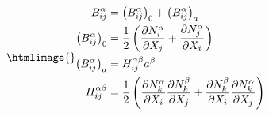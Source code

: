 \documentclass[a4paper,twoside]{article}
\renewcommand{\d}{\partial}\providecommand{\bm}[1]{\mathbf{#1}}
\begin{document}
\begin{flushright}
\begin{subequations}\htmlimage{}
\label{bgdefs}
\begin{align} B_{ij}^\alpha     & =
        \left(B_{ij}^\alpha\right)_0 + \left(B_{ij}^\alpha\right)_a \label{bdef}  \\
  \left(B_{ij}^\alpha\right)_0  & = \frac{1}{2}\left(\frac{\d N_i^\alpha}{\d X_j}
        + \frac{\d N_j^\alpha} {\d X_i} \right)                     \label{b0def} \\
  \left(B_{ij}^\alpha\right)_a  & = H_{ij}^{\alpha \beta} a^\beta   \label{budef} \\
  H_{ij}^{\alpha \beta}         & = 
    \frac{1}{2}\left( \frac{\d N_k^\alpha}{\d X_i} \frac{\d N_k^\beta}{\d X_j} 
    + \frac{\d N_k^\beta}{\d X_i} \frac{\d N_k^\alpha}{\d X_j} \right)  \label{gdef}
\end{align}
\end{subequations}
\end{flushright}
\end{document}
